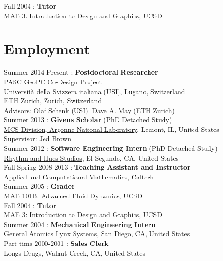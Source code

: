 \documentclass[12pt]{article}
\begin{document}
\noindent Fall 2004 : \textbf{Tutor}\\
 MAE 3: Introduction to Design and Graphics, UCSD\\

\section*{Employment}

\noindent Summer 2014-Present : \textbf{Postdoctoral Researcher} \\
\href{http://www.pasc-ch.org/projects/projects/geopc/}{PASC GeoPC Co-Design Project} \\
Universit\`{a} della Svizzera italiana (USI), Lugano, Switzerland \\
ETH Zurich, Zurich, Switzerland \\
Advisors: Olaf Schenk (USI), Dave A. May (ETH Zurich) \\

\noindent Summer 2013 : \textbf{Givens Scholar} (PhD Detached Study) \\
\href{http://www.mcs.anl.gov}{MCS Division, Argonne National Laboratory}, Lemont, IL, United States \\
Supervisor: Jed Brown \\

\noindent Summer 2012 : \textbf{Software Engineering Intern} (PhD Detached Study)\\
\href{http://www.rhythm.com}{Rhythm and Hues Studios},
El Segundo, CA, United States \\

\noindent Fall-Spring 2008-2013 : \textbf{Teaching Assistant and Instructor}\\
Applied and Computational Mathematics, Caltech\\

\noindent Summer 2005 : \textbf{Grader}\\
 MAE 101B: Advanced Fluid Dynamics, UCSD\\

\noindent Fall 2004 : \textbf{Tutor}\\
 MAE 3: Introduction to Design and Graphics, UCSD\\

\noindent Summer 2004 : \textbf{Mechanical Engineering Intern}\\
General Atomics Lynx Systems, San Diego, CA, United States\\

\noindent Part time 2000-2001 : \textbf{Sales Clerk}\\
Longs Drugs, Walnut Creek, CA, United States\\

\thispagestyle{lastpagestyle}
\end{document}
